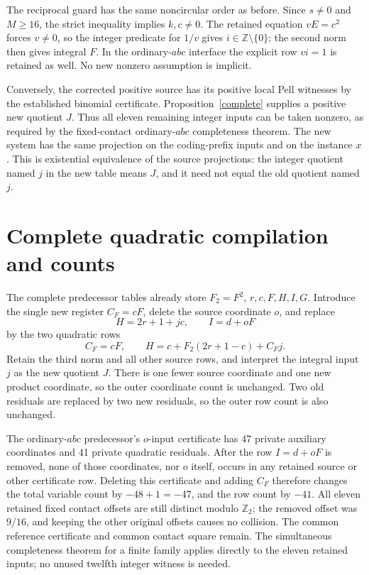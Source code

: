 \documentclass[11pt]{article}
\newcommand{\Z}{\mathbb Z}\newcommand{\Q}{\mathbb Q}
\begin{document}
The reciprocal guard has the same noncircular order as before.
Since \(s\ne0\) and \(M\ge16\), the strict inequality implies
\(k,c\ne0\). The retained equation \(vE=c^2\) forces \(v\ne0\),
so the integer predicate for \(1/v\) gives
\(i\in\Z\setminus\{0\}\); the second norm then gives integral
\(F\). In the ordinary-\(abc\) interface the explicit row
\(vi=1\) is retained as well. No new nonzero assumption is implicit.

Conversely, the corrected positive source has its positive local
Pell witnesses by the established binomial certificate.
Proposition~\ref{complete} supplies a positive new quotient \(J\).
Thus all eleven remaining integer inputs can be taken nonzero, as
required by the fixed-contact ordinary-\(abc\) completeness theorem.
The new system has the same projection on the coding-prefix inputs
and on the instance \(x\). This is existential equivalence of the
source projections: the integer quotient named \(j\) in the new table
means \(J\), and it need not equal the old quotient named \(j\).

\section{Complete quadratic compilation and counts}

The complete predecessor tables already store
\(F_2=F^2\), \(r,c,F,H,I,G\). Introduce the single new register
\(C_F=cF\), delete the source coordinate \(o\), and replace
\[
                       H=2r+1+jc,\qquad I=d+oF
\]
by the two quadratic rows
\begin{equation}\label{tworows}
            C_F=cF,\qquad H=c+F_2(2r+1-c)+C_Fj.
\end{equation}
Retain the third norm and all other source rows, and interpret the
integral input \(j\) as the new quotient \(J\). There is one fewer
source coordinate and one new product coordinate, so the outer
coordinate count is unchanged. Two old residuals are replaced by two
new residuals, so the outer row count is also unchanged.

The ordinary-\(abc\) predecessor's \(o\)-input certificate has
47 private auxiliary coordinates and 41 private quadratic residuals.
After the row \(I=d+oF\) is removed, none of those coordinates,
nor \(o\) itself, occurs in any retained source or other certificate
row. Deleting this certificate and adding \(C_F\) therefore changes
the total variable count by \(-48+1=-47\), and the row count by
\(-41\). All eleven retained fixed contact offsets are still distinct
modulo \(\Z_2\); the removed offset was \(9/16\), and keeping the
other original offsets causes no collision. The common reference
certificate and common contact square remain. The simultaneous
completeness theorem for a finite family applies directly to the
eleven retained inputs; no unused twelfth integer witness is needed.
\end{document}
